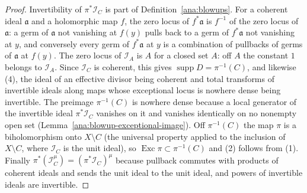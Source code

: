 \begin{proof}
\mixedleanok
Invertibility of \(\pi^*\mathcal I_C\) is part of Definition~\ref{ana:blowups}. For a coherent ideal \(\mathfrak a\) and a
holomorphic map \(f\), the zero locus of \(f^*\mathfrak a\) is \(f^{-1}\) of the zero locus of \(\mathfrak a\): a germ of
\(\mathfrak a\) not vanishing at \(f(y)\) pulls back to a germ of \(f^*\mathfrak a\) not vanishing at \(y\), and conversely every
germ of \(f^*\mathfrak a\) at \(y\) is a combination of pullbacks of germs of \(\mathfrak a\) at \(f(y)\). The zero locus of
\(\mathcal I_A\) is \(A\) for a closed set \(A\): off \(A\) the constant \(1\) belongs to \(\mathcal I_A\). Since \(\mathcal I_C\) is
coherent, this gives \(\operatorname{supp}D=\pi^{-1}(C)\), and likewise (4), the ideal of an effective divisor being coherent and
total transforms of invertible ideals along maps whose exceptional locus is nowhere dense being invertible. The preimage
\(\pi^{-1}(C)\) is nowhere dense because a local generator of the invertible ideal \(\pi^*\mathcal I_C\) vanishes on it and
vanishes identically on no nonempty open set (Lemma~\ref{ana:blowup-exceptional-image}). Off \(\pi^{-1}(C)\) the map \(\pi\) is a
biholomorphism onto \(X\setminus C\) (the universal property applied to the inclusion of \(X\setminus C\), where \(\mathcal I_C\)
is the unit ideal), so \(\operatorname{Exc}\pi\subset\pi^{-1}(C)\) and (2) follows from (1). Finally
\(\pi^*(\mathcal I_C^{\mu})=(\pi^*\mathcal I_C)^{\mu}\) because pullback commutes with products of coherent ideals and sends the unit
ideal to the unit ideal, and powers of invertible ideals are invertible.
\end{proof}

